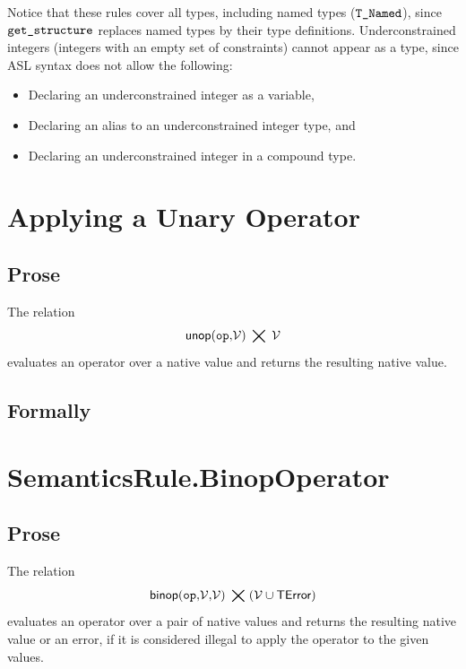 \documentclass{book}
\newcommand\eqdef[0]{:=}
\newcommand\vals[0]{\mathcal{V}}
\newcommand\nvint[0]{\texttt{Int}}
\newcommand\nvbool[0]{\texttt{Bool}}
\newcommand\nvreal[0]{\texttt{Real}}
\newcommand\nvbitvector[0]{\texttt{Bitvector}}
\newcommand\evalarrow[0]{\stackrel{\mathsf{asl}}{\rightsquigarrow}}
\newcommand\aslrel[0]{\bigtimes}
\newcommand\aslsep[0]{\mathbf{,}}
\newcommand\TError[0]{\textsf{TError}}
\newcommand\bits[0]{\texttt{bits}}
\begin{document}
\begin{emptyformal}
Notice that these rules cover all types, including named types ($\texttt{T\_Named}$),
since $\texttt{get\_structure}$ replaces named types by their type definitions.
%
Underconstrained integers (integers with an empty set of constraints)
cannot appear as a type, since ASL syntax does not allow the following:
\begin{itemize}
\item Declaring an underconstrained integer as a variable,
\item Declaring an alias to an underconstrained integer type, and
\item Declaring an underconstrained integer in a compound type.
\end{itemize}
\end{emptyformal}

\section{Applying a Unary Operator \label{sec:UnaryOperator}}
\subsection{Prose}
The relation
\[
  \unop(\op \aslsep \vals) \;\aslrel\; \vals
\]
evaluates an operator over a native value and returns the resulting
native value.

\begin{emptyformal}
\subsection{Formally}
\end{emptyformal}

\section{SemanticsRule.BinopOperator \label{sec:SemanticsRule.BinopOperator}}
\subsection{Prose}
The relation
\[
  \binop(\op \aslsep \vals \aslsep \vals) \;\aslrel\; (\vals \cup \TError)
\]
evaluates an operator over a pair of native values and returns the resulting
native value or an error, if it is considered illegal to apply the operator
to the given values.
\end{document}
